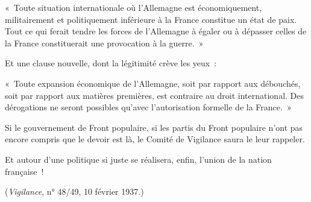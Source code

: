 \documentclass[french,twoside]{book} %
\begin{document}
« Toute situation internationale où l'Allemagne est économiquement, militairement et politiquement inférieure à la France constitue un état de paix. Tout ce qui ferait tendre les forces de l'Allemagne à égaler ou à dépasser celles de la France constituerait une provocation à la guerre. »\par
Et une clause nouvelle, dont la légitimité crève les yeux :\par
« Toute expansion économique de l'Allemagne, soit par rapport aux débouchés, soit par rapport aux matières premières, est contraire au droit international. Des dérogations ne seront possibles qu'avec l'autorisation for­melle de la France. »\par
Si le gouvernement de Front populaire, si les partis du Front populaire n'ont pas encore compris que le devoir est là, le Comité de Vigilance saura le leur rappeler.\par
Et autour d'une politique si juste se réalisera, enfin, l'union de la nation française !\par
({\itshape Vigilance}, n° 48/49, 10 février 1937.)\par
\end{document}
